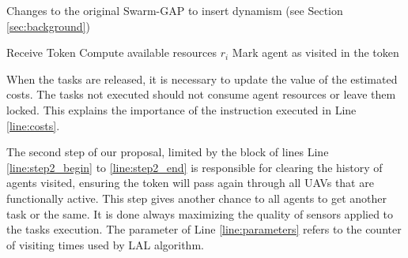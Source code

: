 \begin{algorithm}[!ht]
	\SetAlgoLined
	\DontPrintSemicolon
	\SetNlSkip{0.3em}	
	
	\caption{Changes to the original Swarm-GAP to insert dynamism (see Section \ref{sec:background}) }
	\label{algo:change}
	Receive Token\; \label{line:receivetoken}
	Compute available resources $r_i $ \; \label{line:compute_r}
	Mark agent as visited in the token\; \label{line:marcavisitado}
	\vbox{\colorbox{mygray}{\vbox{
	\label{line:step2_end}
    }}}
\end{algorithm}

When the tasks are released, it is necessary to update the value of the estimated costs. The tasks not executed should not consume agent resources or leave them locked. This explains the importance of the instruction executed in Line \ref{line:costs}. 

The second step of our proposal, limited by the block of lines Line \ref{line:step2_begin} to \ref{line:step2_end} is responsible for clearing the history of agents visited, ensuring the token will pass again through all UAVs that are functionally active. This step gives another chance to all agents to get another task or the same. It is done always maximizing the quality of sensors applied to the tasks execution. The parameter of Line \ref{line:parameters} refers to the counter of visiting times used by LAL algorithm.

